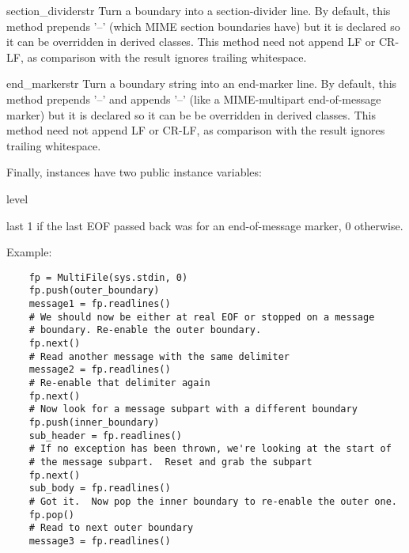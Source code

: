 \begin{methoddesc}{section_divider}{str}
Turn a boundary into a section-divider line.  By default, this
method prepends '--' (which MIME section boundaries have) but it is
declared so it can be overridden in derived classes.  This method
need not append LF or CR-LF, as comparison with the result ignores
trailing whitespace. 
\end{methoddesc}

\begin{methoddesc}{end_marker}{str}
Turn a boundary string into an end-marker line.  By default, this
method prepends '--' and appends '--' (like a MIME-multipart
end-of-message marker) but it is declared so it can be be overridden
in derived classes.  This method need not append LF or CR-LF, as
comparison with the result ignores trailing whitespace.
\end{methoddesc}

Finally,  instances have two public instance variables:

\begin{memberdesc}{level}
\end{memberdesc}

\begin{memberdesc}{last}
1 if the last EOF passed back was for an end-of-message marker, 0 otherwise. 
\end{memberdesc}

Example:

\begin{verbatim}
    fp = MultiFile(sys.stdin, 0)
    fp.push(outer_boundary)
    message1 = fp.readlines()
    # We should now be either at real EOF or stopped on a message
    # boundary. Re-enable the outer boundary.
    fp.next()
    # Read another message with the same delimiter
    message2 = fp.readlines()
    # Re-enable that delimiter again
    fp.next()
    # Now look for a message subpart with a different boundary
    fp.push(inner_boundary)
    sub_header = fp.readlines()
    # If no exception has been thrown, we're looking at the start of
    # the message subpart.  Reset and grab the subpart
    fp.next()
    sub_body = fp.readlines()
    # Got it.  Now pop the inner boundary to re-enable the outer one.
    fp.pop()
    # Read to next outer boundary
    message3 = fp.readlines()
\end{verbatim}
